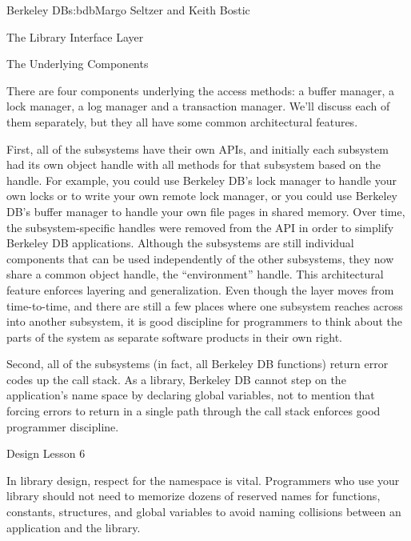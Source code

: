 \begin{aosachapter}{Berkeley DB}{s:bdb}{Margo Seltzer and Keith Bostic}
\begin{aosasect1}{The Library Interface Layer}
\end{aosasect1}

\begin{aosasect1}{The Underlying Components}

There are four components underlying the access methods: a buffer
manager, a lock manager, a log manager and a transaction
manager. We'll discuss each of them separately, but they all have some
common architectural features.

First, all of the subsystems have their own APIs, and initially each
subsystem had its own object handle with all methods for that
subsystem based on the handle. For example, you could use Berkeley
DB's lock manager to handle your own locks or to write your own remote
lock manager, or you could use Berkeley DB's buffer manager to handle
your own file pages in shared memory. Over time, the
subsystem-specific handles were removed from the API in order to
simplify Berkeley DB applications. Although the subsystems are still
individual components that can be used independently of the other
subsystems, they now share a common object handle, the 
``environment'' handle. This architectural feature enforces layering
and generalization. Even though the layer moves from time-to-time, and
there are still a few places where one subsystem reaches across into
another subsystem, it is good discipline for programmers to think about
the parts of the system as separate software products in their own right.

Second, all of the subsystems (in fact, all Berkeley DB functions)
return error codes up the call stack.  As a library, Berkeley DB
cannot step on the application's name space by declaring global
variables, not to mention that forcing errors to return in a single
path through the call stack enforces good programmer discipline. 

\begin{aosabox}{Design Lesson 6}

In library design, respect for the namespace is vital. Programmers who
use your library should not need to memorize dozens of reserved names
for functions, constants, structures, and global variables to avoid
naming collisions between an application and the library.

\end{aosabox}


\end{aosasect1}
\end{aosachapter}

